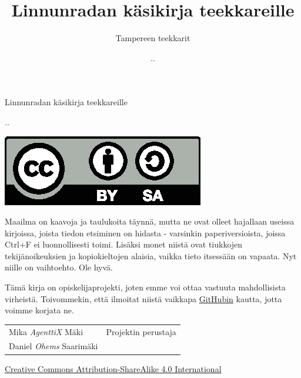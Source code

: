 \documentclass[a4paper, finnish, 12pt, twoside]{article}
\title{Linnunradan käsikirja teekkareille}
\author{Tampereen teekkarit}
\date{\the\day.\the\month.\the\year}
\newcommand*\parttitle{}
\begin{document}
\begin{titlepage}
\centering
{\huge Linnunradan käsikirja teekkareille \par}
{\the\day.\the\month.\the\year \par}
\vfill
\includegraphics{by-sa.eps}
\end{titlepage}


Maailma on kaavoja ja taulukoita täynnä, mutta ne ovat olleet hajallaan useissa kirjoissa,
joista tiedon etsiminen on hidasta - varsinkin paperiversioista, joissa Ctrl+F ei luonnollisesti toimi.
Lisäksi monet niistä ovat tiukkojen tekijänoikeuksien ja kopiokieltojen alaisia,
vaikka tieto itsessään on vapaata. Nyt niille on vaihtoehto. Ole hyvä.

Tämä kirja on opiskelijaprojekti, joten emme voi ottaa vastuuta mahdollisista virheistä.
Toivommekin, että ilmoitat niistä vaikkapa \href{https://github.com/AgenttiX/compendium}{GitHubin} kautta, jotta voimme korjata ne.

\begin{table}[h!]
\centering
\begin{tabular}{ll}
Mika \textit{AgenttiX} Mäki		& Projektin perustaja \\
Daniel \textit{Ohems} Saarimäki \\
\end{tabular}
\end{table}

\vfill
{
	\centering
	\href{https://creativecommons.org/licenses/by-sa/4.0/}{Creative Commons Attribution-ShareAlike 4.0 International}
	\par
}

\pagebreak
\tableofcontents
\vfill %

\pagestyle{fancy}
\fancyhead{} 
\fancyhead[LO,RE]{\MakeUppercase{\textit{\parttitle}}} 
\fancyhead[RO,LE]{\nouppercase{\textit{\rightmark}}}
\fancyfoot{}
\fancyfoot[C]{\thepage}

\pagebreak
{} %





\pagebreak
\renewcommand{\headrulewidth}{0pt} 		%
\fancyhead{}							%
\setcounter{secnumdepth}{-1}			%

\printbibliography
\markboth{\bibname}{\bibname} %
\end{document}
